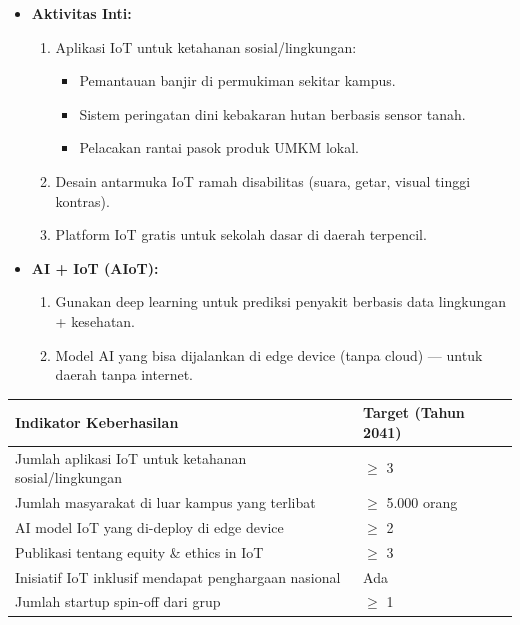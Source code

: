 \documentclass[11pt,a4paper]{article}
\begin{document}
\begin{itemize}
    \item \textbf{Aktivitas Inti:}
          \begin{enumerate}
              \item Aplikasi IoT untuk ketahanan sosial/lingkungan:
                    \begin{itemize}
                        \item Pemantauan banjir di permukiman sekitar kampus.
                        \item Sistem peringatan dini kebakaran hutan berbasis sensor tanah.
                        \item Pelacakan rantai pasok produk UMKM lokal.
                    \end{itemize}
              \item Desain antarmuka IoT ramah disabilitas (suara, getar, visual tinggi kontras).
              \item Platform IoT gratis untuk sekolah dasar di daerah terpencil.
          \end{enumerate}

    \item \textbf{AI + IoT (AIoT):}
          \begin{enumerate}
              \item Gunakan deep learning untuk prediksi penyakit berbasis data lingkungan + kesehatan.
              \item Model AI yang bisa dijalankan di edge device (tanpa cloud) — untuk daerah tanpa internet.
          \end{enumerate}
\end{itemize}

\begin{center}
    \begin{tabular}{ll}
        \toprule
        \textbf{Indikator Keberhasilan}                       & \textbf{Target (Tahun 2041)} \\
        \midrule
        Jumlah aplikasi IoT untuk ketahanan sosial/lingkungan & $\geq$ 3                     \\
        Jumlah masyarakat di luar kampus yang terlibat        & $\geq$ 5.000 orang           \\
        AI model IoT yang di-deploy di edge device            & $\geq$ 2                     \\
        Publikasi tentang equity \& ethics in IoT             & $\geq$ 3                     \\
        Inisiatif IoT inklusif mendapat penghargaan nasional  & Ada                          \\
        Jumlah startup spin-off dari grup                     & $\geq$ 1                     \\
        \bottomrule
    \end{tabular}
\end{center}
\end{document}
